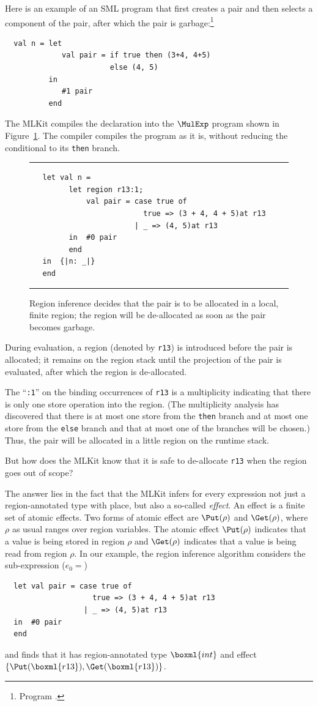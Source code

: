 \documentclass[12pt]{book}
\begin{document}
Here is an example of an SML program that first creates a pair and
then selects a component of the pair, after which the pair is
garbage:\footnote{Program .}
\begin{verbatim}
  val n = let
             val pair = if true then (3+4, 4+5)
                        else (4, 5)
          in
             #1 pair
          end
\end{verbatim}
The MLKit compiles the declaration into the $\MulExp$ program shown in
Figure~\ref{elimpair.fig}.  The compiler compiles the program as it
is, without reducing the conditional to its {\tt then} branch.
\begin{figure}
\hrule\medskip
\begin{verbatim}
   let val n =
         let region r13:1;
             val pair = case true of
                          true => (3 + 4, 4 + 5)at r13
                        | _ => (4, 5)at r13
         in  #0 pair
         end
   in  {|n: _|}
   end
\end{verbatim}
\caption{Region inference decides that the pair is to be allocated
  in a local, finite region; the region will be de-allocated as soon
  as the pair becomes garbage.}
\medskip\hrule
\label{elimpair.fig}
\end{figure}
During evaluation, a region (denoted by {\tt r13}) is introduced before
the pair is allocated; it remains on the region stack until the
projection of the pair is evaluated, after which the region is
de-allocated.

The ``{\tt :1}'' on the binding occurrences of {\tt r13} is a
multiplicity indicating that there is only one store operation into
the region. (The
%
multiplicity analysis has discovered that there is at most one store
from the {\tt then} branch and at most one store from the {\tt else}
branch and that at most one of the branches will be chosen.) Thus, the
pair will be allocated in a little region on the runtime stack.

But how does the MLKit know that it is safe to
%
de-allocate {\tt r13} when the
%
region goes out of scope?

The answer lies in the fact that the MLKit infers for every expression
not just a region-annotated type with place, but also a so-called
%
{\em effect}.  An effect is a finite set of
%
atomic effects. Two forms of atomic effect are
%
$\Put(\rho)$ and
%
$\Get(\rho)$, where $\rho$ as usual ranges over region variables. The
atomic effect $\Put(\rho)$ indicates that a value is being stored in
region $\rho$ and $\Get(\rho)$ indicates that a value is being read
from region $\rho$.  In our example, the region inference algorithm
considers the sub-expression ($e_0=$)
\begin{verbatim}
  let val pair = case true of
                    true => (3 + 4, 4 + 5)at r13
                  | _ => (4, 5)at r13
  in  #0 pair
  end
\end{verbatim}
and finds that it has region-annotated type $\boxml{int}$ and effect
$\{\Put(\boxml{r13}), \Get(\boxml{r13})\}$.
\end{document}
